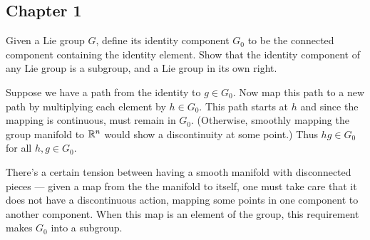 \subsection{Chapter 1}

\begin{p}%
\end{p}

\begin{p}%
\end{p}

\begin{p}%
\end{p}

\begin{p}%
\end{p}


\begin{p}%
{Given a Lie group $G$, define its identity component $G_0$ to be the connected component 
containing the identity element. Show that the identity component of any Lie group is a subgroup, and a Lie
group in its own right.}
\end{p}
{Suppose we have a path from the identity to $g\in G_0$. Now map this 
path to a new path by multiplying each element by $h\in G_0$. This path starts at $h$ and since the mapping is continuous, must remain in $G_0$. (Otherwise, smoothly mapping the group manifold to $\mathbb{R}^n$ would show a 
discontinuity at some point.) Thus $hg\in G_0$ for all $h,g\in G_0$.

There's a certain tension between having a smooth manifold with disconnected pieces --- given a map from the 
the manifold to itself, one must take care that it does not have a discontinuous action, mapping some points in one component to another component. When this map is an element of the group, this requirement makes
$G_0$ into a subgroup.}


